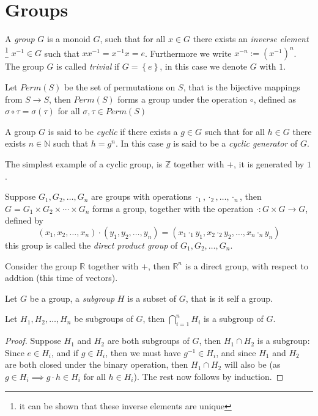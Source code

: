 \section{Groups}%
\label{sec:groups}

A \textit{group} $G$ is a monoid $G$, such that for all $x \in G$ there exists an \textit{inverse element} \footnote{it can be shown that these inverse elements are unique} $x^{-1} \in G$ such that $x x^{-1} = x^{-1} x = e$. Furthermore we write $x^{-n} := (x^{-1})^n$. The group $G$ is called \textit{trivial} if $G = \left\{e\right\}$, in this case we denote $G$ with $1$.

\begin{example}\label{exmp:permuations}
 Let $Perm(S)$ be the set of permutations on $S$, that is the bijective mappings from $S \to S$, then $Perm(S)$ forms a group under the operation $\circ$, defined as $\sigma \circ \tau = \sigma(\tau)$ for all $\sigma, \tau \in Perm(S)$
\end{example}
A group $G$ is said to be \textit{cyclic} if there exists a $g \in G$ such that for all $h \in G$ there exists $n \in \mathbb{N}$ such that $h = g^n$. In this case $g$ is said to be a \textit{cyclic generator} of $G$.
\begin{example}
  The simplest example of a cyclic group, is $\mathbb{Z}$ together with $+$, it is generated by $1$.
\end{example}

Suppose $G_1, G_2, \ldots, G_{n}$ are groups with operations $\cdot_1, \cdot_2, \ldots, \cdot_{n}$, then $G = G_1 \times G_2 \times \cdots \times G_{n}$ forms a group, together with the operation $\cdot: G \times G \to G$, defined by
\begin{equation*}
  (x_1, x_2, \ldots, x_{n}) \cdot (y_1, y_2, \ldots, y_{n}) = (x_1 \cdot_1 y_1, x_2 \cdot_{2} y_{2}, \ldots, x_{n} \cdot_{n} y_{n})
\end{equation*}
this group is called the \textit{direct product group} of $G_1, G_2, \ldots, G_{n}$.

\begin{example}\label{exmp:}
  Consider the group $\mathbb{R}$ together with $+$, then $\mathbb{R}^n$ is a direct group, with respect to addtion (this time of vectors).
\end{example}

Let $G$ be a group, a \textit{subgroup} $H$ is a subset of $G$, that is it self a group.
\begin{proposition}\label{prop:}
  Let $H_1, H_2, \ldots, H_{n}$ be subgroups of $G$, then $\bigcap_{i = 1}^n H_i$ is a subgroup of $G$.
\end{proposition}
\begin{proof}
Suppose $H_1$ and $H_2$ are both subgroups of $G$, then $H_1 \cap H_{2}$ is a subgroup: Since $e \in H_i$, and if $g \in H_i$, then we must have $g^{-1} \in H_{i}$, and since $H_1$ and $H_2$ are both closed under the binary operation, then $H_1 \cap H_2$ will also be (as $g \in H_i \implies g \cdot h \in H_i$ for all $h \in H_i$). The rest now follows by induction.
\end{proof}

